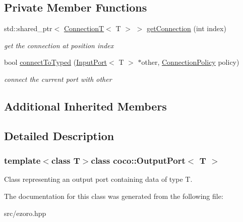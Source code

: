 \subsection*{Private Member Functions}
\begin{DoxyCompactItemize}
\item 
\hypertarget{classcoco_1_1_output_port_a3cfb5103a317583146b7d3697ae78230}{std\-::shared\-\_\-ptr$<$ \hyperlink{classcoco_1_1_connection_t}{Connection\-T}$<$ T $>$ $>$ \hyperlink{classcoco_1_1_output_port_a3cfb5103a317583146b7d3697ae78230}{get\-Connection} (int index)}\label{classcoco_1_1_output_port_a3cfb5103a317583146b7d3697ae78230}

\begin{DoxyCompactList}\small\item\em get the connection at position {\ttfamily index} \end{DoxyCompactList}\item 
\hypertarget{classcoco_1_1_output_port_aee7aa5a4c469f686d560fd9b3ddb78e1}{bool \hyperlink{classcoco_1_1_output_port_aee7aa5a4c469f686d560fd9b3ddb78e1}{connect\-To\-Typed} (\hyperlink{classcoco_1_1_input_port}{Input\-Port}$<$ T $>$ $\ast$other, \hyperlink{structcoco_1_1_connection_policy}{Connection\-Policy} policy)}\label{classcoco_1_1_output_port_aee7aa5a4c469f686d560fd9b3ddb78e1}

\begin{DoxyCompactList}\small\item\em connect the current port with {\ttfamily other} \end{DoxyCompactList}\end{DoxyCompactItemize}
\subsection*{Additional Inherited Members}


\subsection{Detailed Description}
\subsubsection*{template$<$class T$>$class coco\-::\-Output\-Port$<$ T $>$}

Class representing an output port containing data of type T. 

The documentation for this class was generated from the following file\-:\begin{DoxyCompactItemize}
\item 
src/ezoro.\-hpp\end{DoxyCompactItemize}
